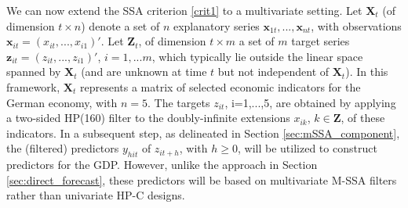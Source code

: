 \documentclass[11pt,a4paper]{article}
\begin{document}
We can now extend the SSA criterion \eqref{crit1} to a multivariate setting. Let $\mathbf{X}_t$ (of dimension $t\times n$) denote a set of $n$ explanatory series $\mathbf{x}_{1t},...,\mathbf{x}_{nt}$, with observations $\mathbf{x}_{it}=(x_{it},...,x_{i1})'$. Let $\mathbf{Z}_t$, of dimension $t\times m$  a set of $m$ target series $\mathbf{z}_{it}=(z_{it},...,z_{i1})'$, $i=1,...m$, which typically lie outside the linear space spanned by   $\mathbf{X}_t$ (and are unknown at time $t$ but not independent of $\mathbf{X}_t$). In this framework, $\mathbf{X}_t$ represents a matrix of selected economic indicators for the German economy, with $n=5$. The targets $z_{it}$, i=1,...,5,   are obtained by applying a two-sided HP(160) filter to the doubly-infinite extensions $x_{ik}$, $k\in \mathbf{Z}$, of these indicators. In a subsequent step, as delineated in Section \eqref{sec:mSSA_component}, the (filtered) predictors $y_{hit}$ of $z_{it+h}$, with $h\geq 0$,  will be utilized to construct predictors for the GDP. However, unlike the approach in Section \eqref{sec:direct_forecast}, these predictors will be based on multivariate M-SSA filters rather than univariate HP-C designs. %
\end{document}
